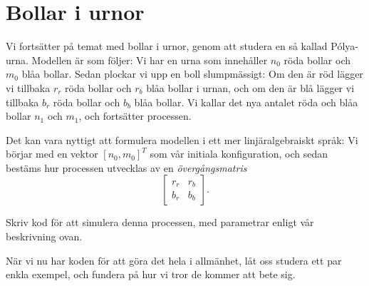 \documentclass[nobib]{tufte-handout}
\begin{document}
\section{Bollar i urnor}

Vi fortsätter på temat med bollar i urnor, genom att studera en så kallad Pólya-urna. Modellen är som följer: Vi har en urna som innehåller $n_0$ röda bollar och $m_0$ blåa bollar. Sedan plockar vi upp en boll slumpmässigt: Om den är röd lägger vi tillbaka $r_r$ röda bollar och $r_b$ blåa bollar i urnan, och om den är blå lägger vi tillbaka $b_r$ röda bollar och $b_b$ blåa bollar. Vi kallar det nya antalet röda och blåa bollar $n_1$ och $m_1$, och fortsätter processen.

Det kan vara nyttigt att formulera modellen i ett mer linjäralgebraiskt språk: Vi börjar med en vektor $[n_0, m_0]^T$ som vår initiala konfiguration, och sedan bestäms hur processen utvecklas av en \emph{övergångsmatris}
$$\begin{bmatrix}
    r_r & r_b \\
    b_r & b_b 
\end{bmatrix}.$$

\begin{xca}
    Skriv kod för att simulera denna processen, med parametrar enligt vår beskrivning ovan.
\end{xca}

När vi nu har koden för att göra det hela i allmänhet, låt oss studera ett par enkla exempel, och fundera på hur vi tror de kommer att bete sig.
\end{document}
